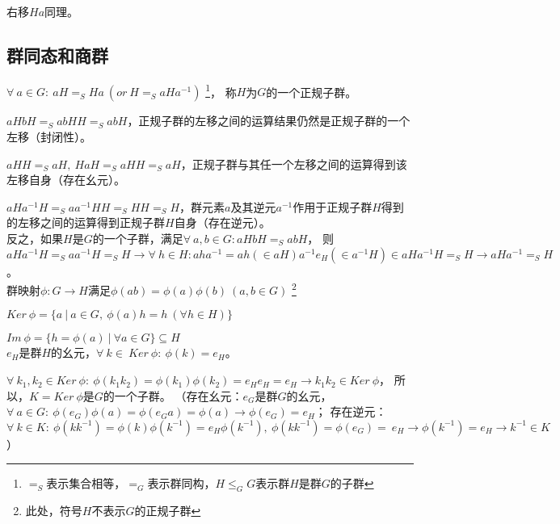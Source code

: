 右移$Ha$同理。


\subsection{群同态和商群}

$\forall\ a\in G:\ aH=_{S}Ha\ (or\ H=_{S}aHa^{-1})$
\footnote{$=_{S}$表示集合相等，$=_{G}$表示群同构，$H \leq_{G} G$表示群$H$是群$G$的子群}，
称$H$为$G$的一个正规子群。

$aHbH=_{S}abHH=_{S}abH$，正规子群的左移之间的运算结果仍然是正规子群的一个左移（封闭性）。

$aHH=_{S}aH,\ HaH=_{S}aHH=_{S}aH$，正规子群与其任一个左移之间的运算得到该左移自身（存在幺元）。

$aHa^{-1}H=_{S}aa^{-1}HH=_{S}HH=_{S}H$，群元素$a$及其逆元$a^{-1}$作用于正规子群$H$得到的左移之间的运算得到正规子群$H$自身（存在逆元）。
\\

反之，如果$H$是$G$的一个子群，满足$\forall\ a,b\in G:aHbH=_{S}abH$，
则$aHa^{-1}H=_{S}aa^{-1}H=_{S}H
\rightarrow \forall\ h\in H:aha^{-1}=ah(\in aH)a^{-1}e_{H}(\in a^{-1}H)\in aHa^{-1}H=_{S}H
\rightarrow aHa^{-1}=_{S}H$。
\\

群映射$\phi:G\rightarrow H$满足$\phi(ab)=\phi(a)\phi(b)\ (a,b\in G)$
\footnote{此处，符号$H$不表示$G$的正规子群}

$Ker\ \phi=\{a\ |\ a\in G,\ \phi(a)h=h\ (\forall h\in H)\}$

$Im\ \phi=\{h=\phi(a)\ |\ \forall a\in G\}\subseteq H$
\\

$e_{H}$是群$H$的幺元，$\forall\ k\in\ Ker\ \phi:\ \phi(k)=e_{H}$。

$\forall\ k_{1},k_{2}\in Ker\ \phi:\ \phi(k_{1}k_{2})=\phi(k_{1})\phi(k_{2})=e_{H}e_{H}=e_{H}
\rightarrow k_{1}k_{2}\in Ker\ \phi$，
所以，$K=Ker\ \phi$是$G$的一个子群。
（存在幺元：$e_{G}$是群$G$的幺元，
$\forall\ a\in G:\ \phi(e_{G})\phi(a)=\phi(e_{G}a)=\phi(a)\rightarrow \phi(e_{G})=e_{H}$；
存在逆元：$\forall\ k\in K:\ \phi(kk^{-1})=\phi(k)\phi(k^{-1})=e_{H}\phi(k^{-1}),
\ \phi(kk^{-1})=\phi(e_{G})=\ e_{H}
\rightarrow \phi(k^{-1})=e_{H}\rightarrow k^{-1}\in K$）

